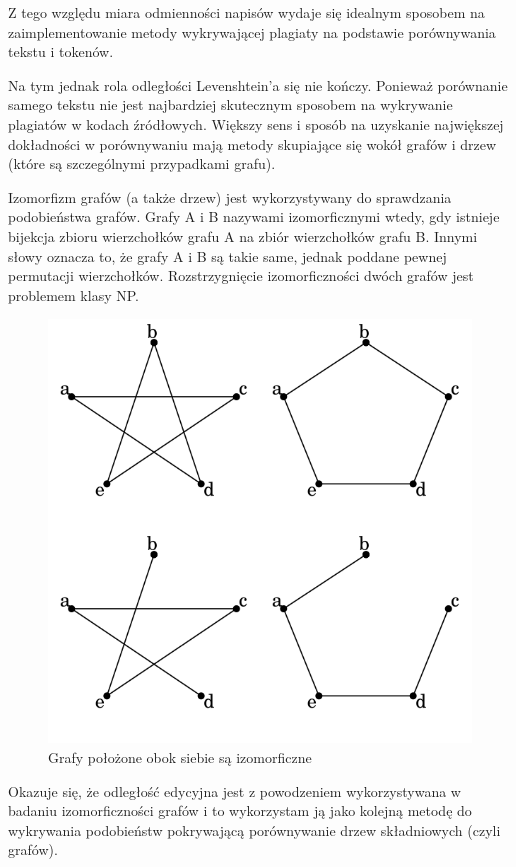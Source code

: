 \documentclass[a4paper,12pt]{article}
\begin{document}
Z tego względu miara odmienności napisów wydaje się idealnym sposobem na zaimplementowanie metody wykrywającej plagiaty na podstawie porównywania tekstu i tokenów.

Na tym jednak rola odległości Levenshtein'a się nie kończy. Ponieważ porównanie samego tekstu nie jest najbardziej skutecznym sposobem na wykrywanie plagiatów w kodach źródłowych. Większy sens i sposób na uzyskanie największej dokładności w porównywaniu mają metody skupiające się wokół grafów i drzew (które są szczególnymi przypadkami grafu).

Izomorfizm grafów (a także drzew) jest wykorzystywany do sprawdzania podobieństwa grafów. Grafy A i B nazywami izomorficznymi wtedy, gdy istnieje bijekcja zbioru wierzchołków grafu A na zbiór wierzchołków grafu B. Innymi słowy oznacza to, że grafy A i B są takie same, jednak poddane pewnej permutacji wierzchołków. Rozstrzygnięcie izomorficzności dwóch grafów jest problemem klasy NP.

\begin{figure}[h!]
\centering
\includegraphics[scale=0.5]{gfx/isomorphism.png}
\caption{Grafy położone obok siebie są izomorficzne}
\end{figure}

Okazuje się, że odległość edycyjna jest z powodzeniem wykorzystywana w badaniu izomorficzności grafów i to wykorzystam ją jako kolejną metodę do wykrywania podobieństw pokrywającą porównywanie drzew składniowych (czyli grafów).
\end{document}
